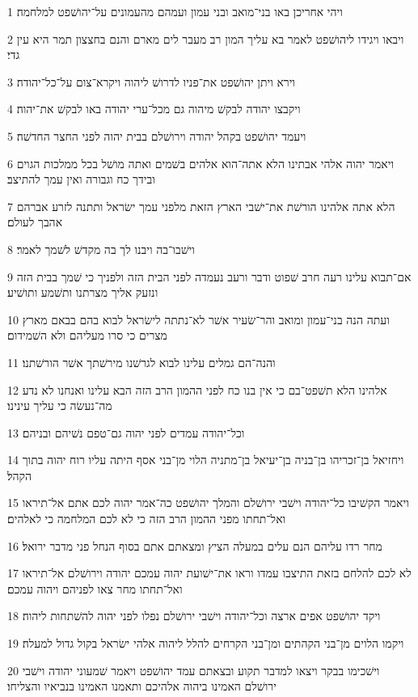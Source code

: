 \par 1 ויהי אחריכן באו בני־מואב ובני עמון ועמהם מהעמונים על־יהושׁפט למלחמה׃
\par 2 ויבאו ויגידו ליהושׁפט לאמר בא עליך המון רב מעבר לים מארם והנם בחצצון תמר היא עין גדי׃
\par 3 וירא ויתן יהושׁפט את־פניו לדרושׁ ליהוה ויקרא־צום על־כל־יהודה׃
\par 4 ויקבצו יהודה לבקשׁ מיהוה גם מכל־ערי יהודה באו לבקשׁ את־יהוה׃
\par 5 ויעמד יהושׁפט בקהל יהודה וירושׁלם בבית יהוה לפני החצר החדשׁה׃
\par 6 ויאמר יהוה אלהי אבתינו הלא אתה־הוא אלהים בשׁמים ואתה מושׁל בכל ממלכות הגוים ובידך כח וגבורה ואין עמך להתיצב׃
\par 7 הלא אתה אלהינו הורשׁת את־ישׁבי הארץ הזאת מלפני עמך ישׂראל ותתנה לזרע אברהם אהבך לעולם׃
\par 8 וישׁבו־בה ויבנו לך בה מקדשׁ לשׁמך לאמר׃
\par 9 אם־תבוא עלינו רעה חרב שׁפוט ודבר ורעב נעמדה לפני הבית הזה ולפניך כי שׁמך בבית הזה ונזעק אליך מצרתנו ותשׁמע ותושׁיע׃
\par 10 ועתה הנה בני־עמון ומואב והר־שׂעיר אשׁר לא־נתתה לישׂראל לבוא בהם בבאם מארץ מצרים כי סרו מעליהם ולא השׁמידום׃
\par 11 והנה־הם גמלים עלינו לבוא לגרשׁנו מירשׁתך אשׁר הורשׁתנו׃
\par 12 אלהינו הלא תשׁפט־בם כי אין בנו כח לפני ההמון הרב הזה הבא עלינו ואנחנו לא נדע מה־נעשׂה כי עליך עינינו׃
\par 13 וכל־יהודה עמדים לפני יהוה גם־טפם נשׁיהם ובניהם׃
\par 14 ויחזיאל בן־זכריהו בן־בניה בן־יעיאל בן־מתניה הלוי מן־בני אסף היתה עליו רוח יהוה בתוך הקהל׃
\par 15 ויאמר הקשׁיבו כל־יהודה וישׁבי ירושׁלם והמלך יהושׁפט כה־אמר יהוה לכם אתם אל־תיראו ואל־תחתו מפני ההמון הרב הזה כי לא לכם המלחמה כי לאלהים׃
\par 16 מחר רדו עליהם הנם עלים במעלה הציץ ומצאתם אתם בסוף הנחל פני מדבר ירואל׃
\par 17 לא לכם להלחם בזאת התיצבו עמדו וראו את־ישׁועת יהוה עמכם יהודה וירושׁלם אל־תיראו ואל־תחתו מחר צאו לפניהם ויהוה עמכם׃
\par 18 ויקד יהושׁפט אפים ארצה וכל־יהודה וישׁבי ירושׁלם נפלו לפני יהוה להשׁתחות ליהוה׃
\par 19 ויקמו הלוים מן־בני הקהתים ומן־בני הקרחים להלל ליהוה אלהי ישׂראל בקול גדול למעלה׃
\par 20 וישׁכימו בבקר ויצאו למדבר תקוע ובצאתם עמד יהושׁפט ויאמר שׁמעוני יהודה וישׁבי ירושׁלם האמינו ביהוה אלהיכם ותאמנו האמינו בנביאיו והצליחו׃
